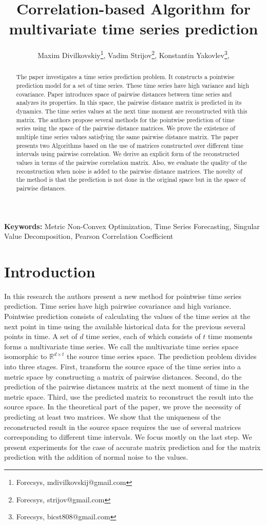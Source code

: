 \documentclass[12pt]{article}
\title{Correlation-based Algorithm for multivariate time series prediction}
\author{%
	Maxim Divilkovskiy\footnote{Forecsys, mdivilkovskij@gmail.com},  %
	Vadim Strijov\footnote{Forecsys,  strijov@gmail.com},  %
	Konstantin Yakovlev\footnote{Forecsys,  bicst808@gmail.com},  %
}
\begin{document}
\maketitle

\begin{abstract}
The paper investigates a time series prediction problem. It constructs a pointwise prediction model for a set of time series. These time series have high variance and high covariance. Paper introduces space of pairwise distances between time series and analyzes its properties. In this space, the pairwise distance matrix is predicted in its dynamics. The time series values at the next time moment are reconstructed with this matrix. The authors propose several methods for the pointwise prediction of time series using the space of the pairwise distance matrices. We prove the existence of multiple time series values satisfying the same pairwise distance matrix. The paper presents two Algorithms based on the use of matrices constructed over different time intervals using pairwise correlation. We derive an explicit form of the reconstructed values in terms of the pairwise correlation matrix. Also, we evaluate the quality of the reconstruction when noise is added to the pairwise distance matrices. The novelty of the method is that the prediction is not done in the original space but in the space of pairwise distances.


\end{abstract}

\textbf{Keywords:} Metric Non-Convex Optimization, Time Series Forecasting, Singular Value Decomposition, Pearson Correlation Coefficient

\section{Introduction}
 	In this research the authors present a new method for pointwise time series prediction. Time series have high pairwise covariance and high variance. Pointwise prediction consists of calculating the values of the time series at the next point in time using the available historical data for the previous several points in time. A set of $d$ time series, each of which consists of $t$ time moments forms a multivariate time series. We call the multivariate time series space isomorphic to $\mathbb{R}^{d \times t}$ the source time series space. The prediction problem divides into three stages. First, transform the source space of the time series into a metric space by constructing a matrix of pairwise distances. Second, do the prediction of the pairwise distances matrix at the next moment of time in the metric space. Third, use the predicted matrix to reconstruct the result into the source space. In the theoretical part of the paper, we prove the necessity of predicting at least two matrices. We show that the uniqueness of the reconstructed result in the source space requires the use of several matrices corresponding to different time intervals. We focus mostly on the last step. We present experiments for the case of accurate matrix prediction and for the matrix prediction with the addition of normal noise to the values.
\end{document}

